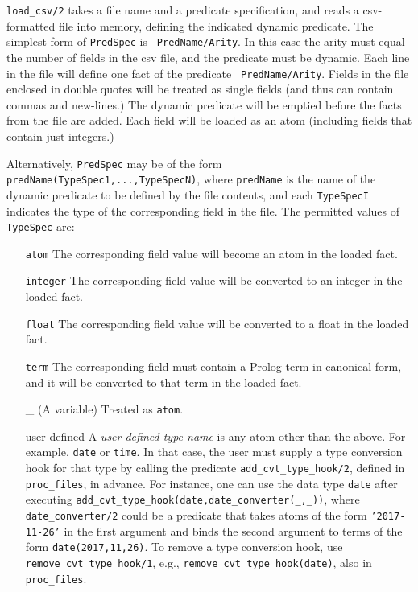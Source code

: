 \begin{description}


{\tt load\_csv/2} takes a file name and a predicate specification, and
reads a csv-formatted file into memory, defining the indicated dynamic
predicate.  The simplest form of {\tt PredSpec} is {\tt
PredName/Arity}.  In this case the arity must equal the number of
fields in the csv file, and the predicate must be dynamic.  Each line
in the file will define one fact of the predicate {\tt
PredName/Arity}.  Fields in the file enclosed in double quotes will
be treated as single fields (and thus can contain commas and
new-lines.)  The dynamic predicate will be emptied before the facts
from the file are added.  Each field will be loaded as an atom
(including fields that contain just integers.)

Alternatively, {\tt PredSpec} may be of the form {\tt
predName(TypeSpec1,...,TypeSpecN)}, where {\tt predName} is the name
of the dynamic predicate to be defined by the file contents, and each
{\tt TypeSpecI} indicates the type of the corresponding field in the
file.  The permitted values of {\tt TypeSpec} are:
\begin{itemize}
\item[{\tt atom}] The corresponding field value will become an atom in
the loaded fact.
\item[{\tt integer}] The corresponding field value will be converted
to an integer in the loaded fact.
\item[{\tt float}] The corresponding field value will be converted to
a float in the loaded fact.
\item[{\tt term}] The corresponding field must contain a Prolog term in
canonical form, and it will be converted to that term in the loaded
fact. 
\item[\_] (A variable) Treated as {\tt atom}.
\item[\textnormal{user-defined}]
  A \emph{user-defined type name} is any atom other than the above.
  For example,  \texttt{date}   or \texttt{time}.
  In that case, the user must supply a type conversion hook for that type
  by calling the predicate  \texttt{add\_cvt\_type\_hook/2}, defined in
  \texttt{proc\_files}, in advance. For instance, one can use the data type
  \texttt{date} after executing
  \texttt{add\_cvt\_type\_hook(date,date\_converter(\_,\_))}, where
  \texttt{date\_converter/2}  could be a predicate that takes atoms of the form
  \texttt{'2017-11-26'} in the first argument
  and binds the second argument to terms of the form
  \texttt{date(2017,11,26)}.
  To remove a type conversion hook, use \texttt{remove\_cvt\_type\_hook/1},
  e.g.,  \texttt{remove\_cvt\_type\_hook(date)}, also in
  \texttt{proc\_files}.
\end{itemize}


\end{description}
